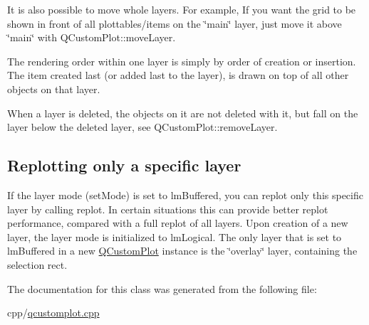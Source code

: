 It is also possible to move whole layers. For example, If you want the grid to be shown in front of all plottables/items on the \char`\"{}main\char`\"{} layer, just move it above \char`\"{}main\char`\"{} with Q\+Custom\+Plot\+::move\+Layer.

The rendering order within one layer is simply by order of creation or insertion. The item created last (or added last to the layer), is drawn on top of all other objects on that layer.

When a layer is deleted, the objects on it are not deleted with it, but fall on the layer below the deleted layer, see Q\+Custom\+Plot\+::remove\+Layer.\hypertarget{class_q_c_p_layer_qcplayer-buffering}{}\subsection{Replotting only a specific layer}\label{class_q_c_p_layer_qcplayer-buffering}
If the layer mode (set\+Mode) is set to lm\+Buffered, you can replot only this specific layer by calling replot. In certain situations this can provide better replot performance, compared with a full replot of all layers. Upon creation of a new layer, the layer mode is initialized to lm\+Logical. The only layer that is set to lm\+Buffered in a new \mbox{\hyperlink{class_q_custom_plot}{Q\+Custom\+Plot}} instance is the \char`\"{}overlay\char`\"{} layer, containing the selection rect. 

The documentation for this class was generated from the following file\+:\begin{DoxyCompactItemize}
\item 
cpp/\mbox{\hyperlink{qcustomplot_8cpp}{qcustomplot.\+cpp}}\end{DoxyCompactItemize}

